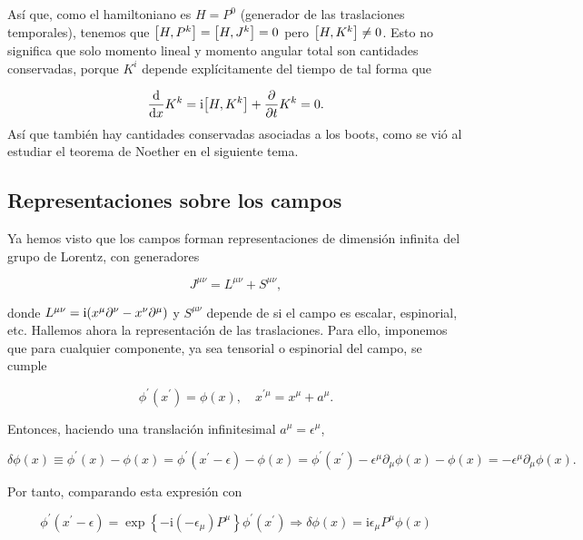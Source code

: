 Así que, como el hamiltoniano es $H = P^0$ (generador de las traslaciones temporales), tenemos que $\comm{H}{P^k}=\comm{H}{J^k}=0$ pero $\comm{H}{K^k} \neq 0$. Esto no significa que solo momento lineal y momento angular total son cantidades conservadas, porque $K^i$ depende explícitamente del tiempo de tal forma que

\begin{equation}
    \dv{x} K^k = \ii \comm{H}{K^k}+\pdv{t}K^k=0.
\end{equation}
Así que también hay cantidades conservadas asociadas a los boots, como se vió al estudiar el teorema de Noether en el siguiente tema.

\subsection{Representaciones sobre los campos}

Ya hemos visto que los campos forman representaciones de dimensión infinita del grupo de Lorentz, con generadores

\begin{equation}
    J^{\mu \nu}=L^{\mu \nu}+S^{\mu \nu},
    \label{eq_A1.107}
\end{equation}

donde $L^{\mu \nu}=\mathrm{i} \qty(x^\mu \partial^\nu-x^\nu \partial^\mu )$ y $S^{\mu \nu}$ depende de si el campo es escalar, espinorial, etc. Hallemos ahora la representación de las traslaciones. Para ello, imponemos que para cualquier componente, ya sea tensorial o espinorial del campo, se cumple

\begin{equation}
    \phi^{\prime}\left(x^{\prime}\right)=\phi(x), \quad x^{\prime \mu}=x^\mu+a^\mu.
\end{equation}

Entonces, haciendo una translación infinitesimal $a^\mu=\epsilon^\mu$,

\begin{equation}
    \delta \phi(x) \equiv \phi^{\prime}(x) -  \phi (x) = \phi^{\prime}\left(x^{\prime}-\epsilon\right)-\phi(x)=\phi^{\prime}\left(x^{\prime}\right)-\epsilon^\mu \partial_\mu \phi(x)-\phi(x)=-\epsilon^\mu \partial_\mu \phi(x).
\end{equation}

Por tanto, comparando esta expresión con

\begin{equation}
    \phi^{\prime}\left(x^{\prime}-\epsilon\right)=\exp \left\{-\mathrm{i}\left(-\epsilon_\mu\right) P^\mu\right\} \phi^{\prime}\left(x^{\prime}\right) \Rightarrow \delta \phi(x)=\mathrm{i} \epsilon_\mu P^\mu \phi(x)
\end{equation}

